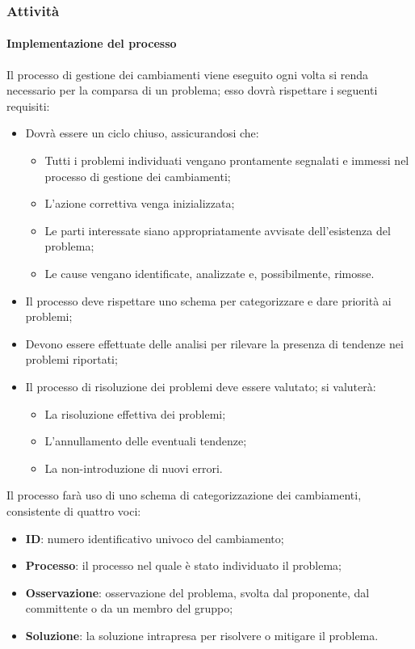 \documentclass[../norme-di-progetto.tex]{subfiles}
\begin{document}
\subsubsection{Attività}
\paragraph{Implementazione del processo}
Il processo di gestione dei cambiamenti viene eseguito ogni volta si renda necessario per la comparsa di un problema; esso dovrà rispettare i seguenti requisiti:
\begin{itemize}
  \item Dovrà essere un ciclo chiuso, assicurandosi che:
  \begin{itemize}
    \item Tutti i problemi individuati vengano prontamente segnalati e immessi nel processo di gestione dei cambiamenti;
    \item L'azione correttiva venga inizializzata;
    \item Le parti interessate siano appropriatamente avvisate dell'esistenza del problema;
    \item Le cause vengano identificate, analizzate e, possibilmente, rimosse.
  \end{itemize}
  \item Il processo deve rispettare uno schema per categorizzare e dare priorità ai problemi;
  \item Devono essere effettuate delle analisi per rilevare la presenza di tendenze nei problemi riportati;
  \item Il processo di risoluzione dei problemi deve essere valutato; si valuterà:
  \begin{itemize}
    \item La risoluzione effettiva dei problemi;
    \item L'annullamento delle eventuali tendenze;
    \item La non-introduzione di nuovi errori.
  \end{itemize}
\end{itemize}
Il processo farà uso di uno schema di categorizzazione dei cambiamenti, consistente di quattro voci:
\begin{itemize}
  \item \textbf{ID}: numero identificativo univoco del cambiamento;
  \item \textbf{Processo}: il processo nel quale è stato individuato il problema;
  \item \textbf{Osservazione}: osservazione del problema, svolta dal proponente, dal committente o da un membro del gruppo;
  \item \textbf{Soluzione}: la soluzione intrapresa per risolvere o mitigare il problema.
\end{itemize}
\end{document}
